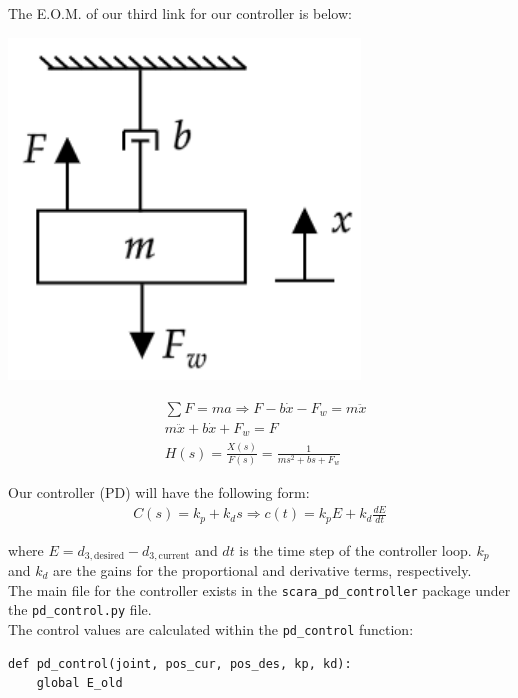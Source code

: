 \documentclass[10pt]{article}
\begin{document}
\begin{enumerate}
	The E.O.M. of our third link for our controller is below:
	
	\begin{minipage}[h]{0.3\textwidth}
		\centering
		\includegraphics[width=0.7\textwidth]{figures/mass_damper.png}
	\end{minipage}
	\begin{minipage}[h]{0.5\textwidth}
		\begin{align*}
			&\sum{F} = m a \Rightarrow F - b \dot{x} - F_w = m \ddot{x} \\
			&m \ddot{x} + b \dot{x} + F_w = F \\
			&H(s) = \frac{X(s)}{F(s)} = \frac{1}{m s^2 + b s + F_w}
		\end{align*}
	\end{minipage}
	
	Our controller (PD) will have the following form:
	\begin{align*}
		C(s) = k_p + k_d s \Rightarrow c(t) = k_p E + k_d \frac{dE}{dt}
	\end{align*}
	
	where $E = d_{3,\text{desired}} - d_{3,\text{current}}$ and $dt$ is the time step of the controller loop. $k_p$ and $k_d$ are the gains for the proportional and derivative terms, respectively.
	\\
	
	The main file for the controller exists in the \texttt{scara\_pd\_controller} package under the \texttt{pd\_control.py} file.
	\\
	
	The control values are calculated within the \texttt{pd\_control} function:
	
\begin{lstlisting}[style=Matlab-editor,basicstyle=\mlttfamily,escapechar=`]
def pd_control(joint, pos_cur, pos_des, kp, kd):
	global E_old
	

\end{lstlisting}
\end{enumerate}
\end{document}
